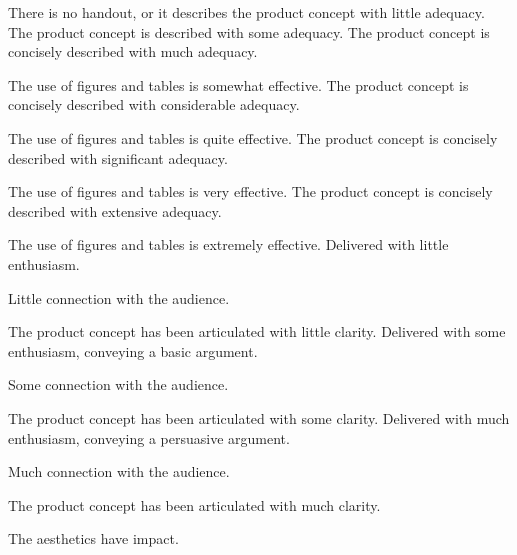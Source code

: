 \documentclass{../../fal_assignment}
\begin{document}
\begin{markingrubric}
%
        \grade\fail There is no handout, or it describes the product concept with little adequacy.
        \grade The product concept is described with some adequacy.
        \grade The product concept is concisely described with much adequacy.
            \par The use of figures and tables is somewhat effective.
        \grade The product concept is concisely described with considerable adequacy.
            \par The use of figures and tables is quite effective.
        \grade The product concept is concisely described with significant adequacy.
            \par The use of figures and tables is very effective.
        \grade The product concept is concisely described with extensive adequacy.
            \par The use of figures and tables is extremely effective.
%
        \grade \fail Delivered with little enthusiasm. 
            \par Little connection with the audience.
            \par The product concept has been articulated with little clarity.
        \grade Delivered with some enthusiasm, conveying a basic argument. 
            \par Some connection with the audience.
            \par The product concept has been articulated with some clarity.
        \grade Delivered with much enthusiasm, conveying a persuasive argument. 
            \par Much connection with the audience.
            \par The product concept has been articulated with much clarity.
            \par The aesthetics have impact.

\end{markingrubric}
\end{document}
